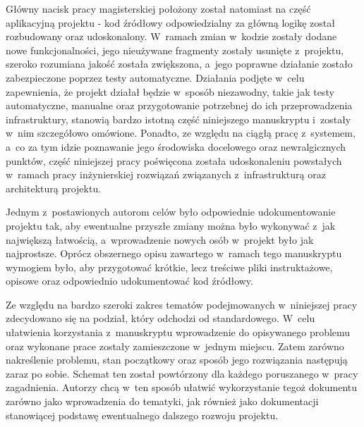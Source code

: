 Główny nacisk pracy magisterskiej położony został natomiast na część aplikacyjną projektu - kod źródłowy odpowiedzialny za główną logikę został rozbudowany oraz udoskonalony. W~ramach zmian w~kodzie zostały dodane nowe funkcjonalności, jego nieużywane fragmenty zostały usunięte z~projektu, szeroko rozumiana jakość została zwiększona, a~jego poprawne działanie zostało zabezpieczone poprzez testy automatyczne. Działania podjęte w~celu zapewnienia, że projekt działał będzie w~sposób niezawodny, takie jak testy automatyczne, manualne oraz przygotowanie potrzebnej do ich przeprowadzenia infrastruktury, stanowią bardzo istotną część niniejszego manuskryptu i~zostały w~nim szczegółowo omówione. Ponadto, ze względu na ciągłą pracę z~systemem, a~co za tym idzie poznawanie jego środowiska docelowego oraz newralgicznych punktów, część niniejszej pracy poświęcona została udoskonaleniu powstałych w~ramach pracy inżynierskiej rozwiązań związanych z~infrastrukturą oraz architekturą projektu.

Jednym z~postawionych autorom celów było odpowiednie udokumentowanie projektu tak, aby ewentualne przyszłe zmiany można było wykonywać z~jak największą łatwością, a~wprowadzenie nowych osób w~projekt było jak najprostsze. Oprócz obszernego opisu zawartego w~ramach tego manuskryptu wymogiem było, aby przygotować krótkie, lecz treściwe pliki instruktażowe, opisowe oraz odpowiednio udokumentować kod źródłowy.

Ze względu na bardzo szeroki zakres tematów podejmowanych w~niniejszej pracy zdecydowano się na podział, który odchodzi od standardowego. W~celu ułatwienia korzystania z~manuskryptu wprowadzenie do opisywanego problemu oraz wykonane prace zostały zamieszczone w~jednym miejscu. Zatem zarówno nakreślenie problemu, stan początkowy oraz sposób jego rozwiązania następują zaraz po sobie. Schemat ten został powtórzony dla każdego poruszanego w~pracy zagadnienia. Autorzy chcą w~ten sposób ułatwić wykorzystanie tegoż dokumentu zarówno jako wprowadzenia do tematyki, jak również jako dokumentacji stanowiącej podstawę ewentualnego dalszego rozwoju projektu.
